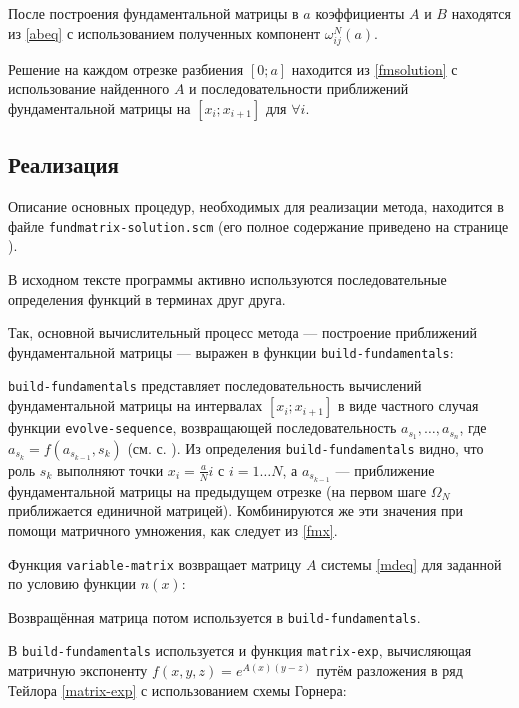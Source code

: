\documentclass{article}
\newcommand{\filename}[1]{\texttt{#1}}
\newcommand{\procname}[1]{\texttt{#1}}
\numberwithin{equation}{section}
\begin{document}
После построения фундаментальной матрицы в $a$ коэффициенты $A$ и $B$
находятся из \eqref{abeq} с использованием полученных компонент
$\omega_{ij}^N(a)$.

Решение на каждом отрезке разбиения $[0; a]$ находится из
\eqref{fmsolution} с использование найденного $A$ и последовательности
приближений фундаментальной матрицы на $[x_i; x_{i+1}]$ для $\forall
i$.

\clearpage
\subsection{Реализация}

Описание основных процедур, необходимых для реализации метода,
находится в файле \filename{fundmatrix-solution.scm} (его полное содержание
приведено на странице \pageref{fundmatrix-solution.scm-full-listing}).

В исходном тексте программы активно используются последовательные
определения функций в терминах друг друга.

Так, основной вычислительный процесс метода — построение приближений
фундаментальной матрицы — выражен в функции
\procname{build-fundamentals}:



\procname{build-fundamentals} представляет последовательность вычислений
фундаментальной матрицы на интервалах $[x_i; x_{i+1}]$ в виде частного
случая функции \procname{evolve-sequence}, возвращающей
последовательность $a_{s_1}, \dotsc, a_{s_n}$, где $a_{s_k} =
f(a_{s_{k-1}}, s_k)$
(см. с. \pageref{shared.scm-full-listing}). Из определения
\procname{build-fundamentals} видно, что роль $s_k$ выполняют точки $x_i
= \frac{a}{N}i$ с $i = 1 \dotso N$, а $a_{s_{k-1}}$ — приближение
фундаментальной матрицы на предыдущем отрезке (на первом шаге
$\Omega_N$ приближается единичной матрицей). Комбинируются же эти
значения при помощи матричного умножения, как следует из \eqref{fmx}.

Функция \procname{variable-matrix} возвращает матрицу $A$ системы
\eqref{mdeq} для заданной по условию функции $n(x)$:



Возвращённая матрица потом используется в \procname{build-fundamentals}.

В \procname{build-fundamentals} используется и функция
\procname{matrix-exp}, вычисляющая матричную
экспоненту $f(x, y, z) = e^{A(x)(y-z)}$ путём разложения в ряд Тейлора
\eqref{matrix-exp} с использованием схемы Горнера:
\end{document}
